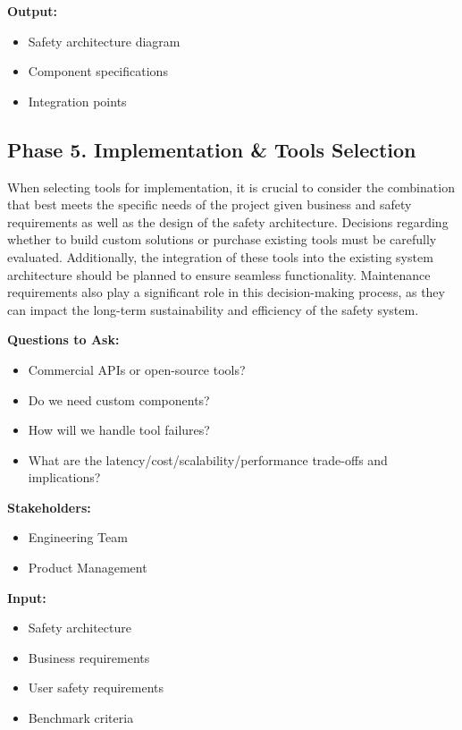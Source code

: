 \textbf{Output:}
\begin{itemize}
    \item Safety architecture diagram
    \item Component specifications
    \item Integration points
\end{itemize}

\subsection{Phase 5. Implementation \& Tools Selection}

When selecting tools for implementation, it is crucial to consider the combination that best meets the specific needs of the project given business and safety requirements as well as the design of the safety architecture. Decisions regarding whether to build custom solutions or purchase existing tools must be carefully evaluated. Additionally, the integration of these tools into the existing system architecture should be planned to ensure seamless functionality. Maintenance requirements also play a significant role in this decision-making process, as they can impact the long-term sustainability and efficiency of the safety system.

\textbf{Questions to Ask:}
\begin{itemize}
    \item Commercial APIs or open-source tools?
    \item Do we need custom components?
    \item How will we handle tool failures?
    \item What are the latency/cost/scalability/performance trade-offs and implications?
\end{itemize}

\textbf{Stakeholders:}
\begin{itemize}
    \item Engineering Team
    \item Product Management
\end{itemize}

\textbf{Input:}
\begin{itemize}
    \item Safety architecture
    \item Business requirements
    \item User safety requirements
    \item Benchmark criteria
\end{itemize}


